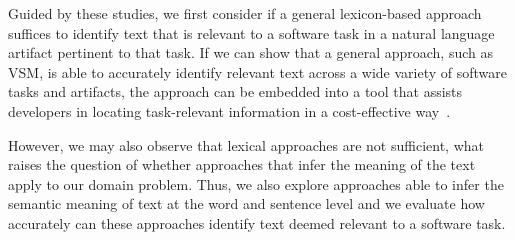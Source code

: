 Guided by these studies, we first consider if a general lexicon-based approach suffices to identify text that is relevant to a software task in a natural language artifact pertinent to that task. If we can show that a general approach, such as \acs{VSM}, is able to accurately identify relevant text across a wide variety of software tasks and artifacts, 
the approach can be embedded into a tool that assists developers in locating task-relevant information
in a cost-effective way~\cite{Rastkar2013}.


However, we may also observe that lexical approaches are not sufficient, what raises the question of whether approaches that infer the meaning of the text apply to our domain problem.
Thus, we also explore approaches able to infer the semantic meaning of text at the word and sentence level 
and we evaluate how accurately can these approaches identify text deemed relevant to a software task.






